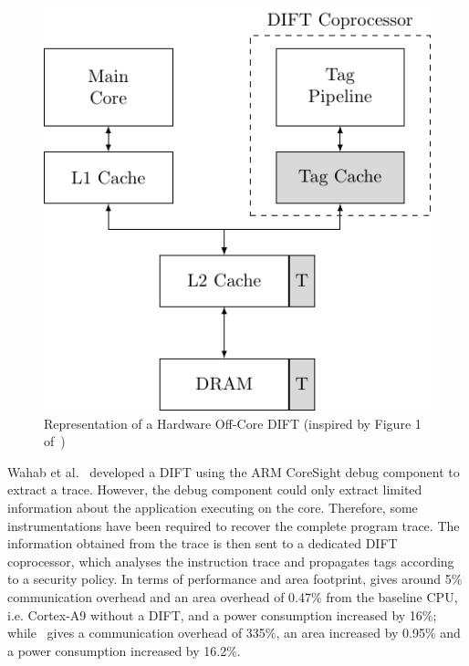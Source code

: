 \begin{figure}[ht]
    \centering
    \includegraphics{c2_soa/img/offcore.pdf}
    \caption{Representation of a Hardware Off-Core DIFT (inspired by Figure 1 of~\cite{KDK-09-dsn})}
    \label{fig:offcore_dift}
\end{figure}

Wahab et al.~\cite{WCAHLG-17-fpl, WCAHBLG-18-reconfig} developed a DIFT using the ARM CoreSight debug component to extract a trace.
However, the debug component could only extract limited information about the application executing on the core. Therefore, some instrumentations have been required to recover the complete program trace. The information obtained from the trace is then sent to a dedicated DIFT coprocessor, which analyses the instruction trace and propagates tags according to a security policy. In terms of performance and area footprint, \cite{WCAHLG-17-fpl} gives around 5\% communication overhead and an area overhead of 0.47\% from the baseline CPU, i.e. Cortex-A9 without a DIFT, and a power consumption increased by 16\%; while~\cite{WCAHBLG-18-reconfig} gives a communication overhead of 335\%, an area increased by 0.95\% and a power consumption increased by 16.2\%.

